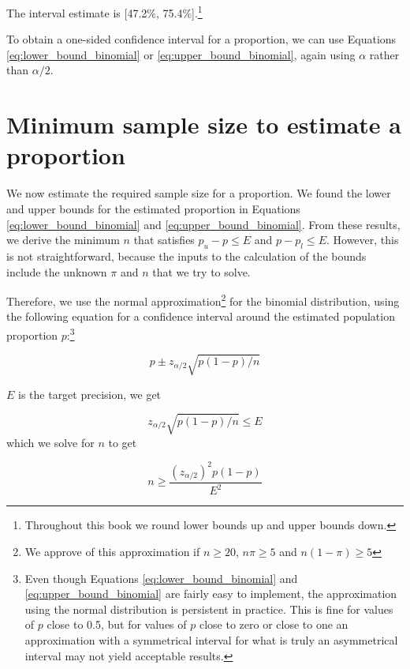 The interval estimate is [47.2\%, 75.4\%].\footnote{Throughout this book we round lower bounds up and upper bounds down.}

To obtain a one-sided confidence interval for a proportion, we can use Equations \ref{eq:lower_bound_binomial} or \ref{eq:upper_bound_binomial}, again using $\alpha$ rather than $\alpha/2$.


\section{Minimum sample size to estimate a proportion} %
\label{sec:minimum_sample_size_to_estimate_a_proportion}

We now estimate the required sample size for a proportion. We found the lower and upper bounds for the estimated proportion in Equations \ref{eq:lower_bound_binomial} and \ref{eq:upper_bound_binomial}. From these results, we derive the minimum $n$ that satisfies $p_u - p \leq E$ and $p - p_l \leq E$. However, this is not straightforward, because the inputs to the calculation of the bounds include the unknown $\pi$ and $n$ that we try to solve.

Therefore, we use the normal approximation\footnote{We approve of this approximation if $n \geq 20$, $n\pi \geq 5$ and $n(1-\pi) \geq 5$} for the binomial distribution, using the following equation for a confidence interval around the estimated population proportion $p$:\footnote{Even though Equations \ref{eq:lower_bound_binomial} and \ref{eq:upper_bound_binomial} are fairly easy to implement, the approximation using the normal distribution is persistent in practice. This is fine for values of $p$ close to 0.5, but for values of $p$ close to zero or close to one an approximation with a symmetrical interval for what is truly an asymmetrical interval may not yield acceptable results.}

\begin{equation*}
  p \pm z_{\alpha/2} \sqrt{p(1-p)/n}
\end{equation*}

$E$ is the target precision, we get

\begin{equation*}
  z_{\alpha/2} \sqrt{p(1-p)/n} \leq E
\end{equation*}
which we solve for $n$ to get

\begin{equation}
  n \geq \frac{(z_{\alpha/2})^2 p(1-p)}{E^2}
  \label{eq:sampsize_proportion}
\end{equation}

